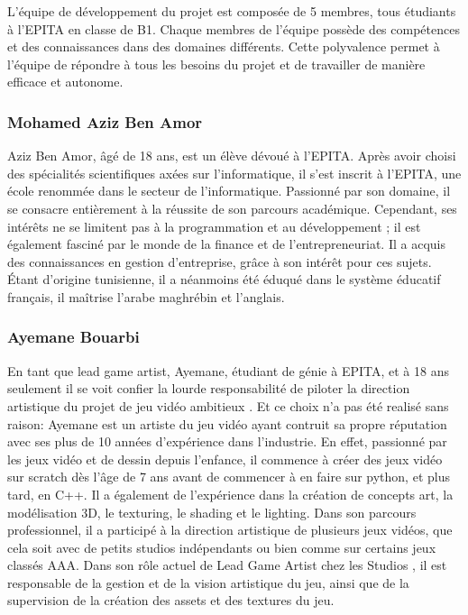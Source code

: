 

L'équipe de développement du projet est composée de 5 membres, tous étudiants à l'EPITA en classe de B1.
Chaque membres de l'équipe possède des compétences et des connaissances dans des domaines différents.
Cette polyvalence permet à l'équipe de répondre à tous les besoins du projet et de travailler de manière efficace et autonome.


\subsubsection*{Mohamed Aziz Ben Amor}

Aziz Ben Amor, âgé de 18 ans, est un élève dévoué à l'EPITA. 
Après avoir choisi des spécialités scientifiques axées sur l'informatique, il s'est inscrit à l'EPITA, une école renommée dans le secteur de l'informatique. 
Passionné par son domaine, il se consacre entièrement à la réussite de son parcours académique.
Cependant, ses intérêts ne se limitent pas à la programmation et au développement ; il est également fasciné par le monde de la finance et de l'entrepreneuriat. 
Il a acquis des connaissances en gestion d'entreprise, grâce à son intérêt pour ces sujets. 
Étant d'origine tunisienne, il a néanmoins été éduqué dans le système éducatif français, il maîtrise l'arabe maghrébin et l'anglais. 



\subsubsection*{Ayemane Bouarbi}

En tant que lead game artist, Ayemane, étudiant de génie à EPITA, et à 18 ans seulement il se voit confier la lourde responsabilité de piloter la direction artistique du projet de jeu vidéo ambitieux \textit{\gameName}. 
Et ce choix n’a pas été realisé sans raison: Ayemane est un artiste du jeu vidéo ayant contruit sa propre réputation avec ses plus de 10 années d'expérience dans l’industrie. 
En effet, passionné par les jeux vidéo et de dessin depuis l’enfance, il commence à créer des jeux vidéo sur scratch dès l'âge de 7 ans avant de commencer à en faire sur python, et plus tard, en C++. 
Il a également de l’expérience dans la création de concepts art, la modélisation 3D, le texturing, le shading et le lighting.
Dans son parcours professionnel, il a participé à la direction artistique de plusieurs jeux vidéos, que cela soit avec de petits studios indépendants ou bien comme sur certains jeux classés AAA.
Dans son rôle actuel de Lead Game Artist chez les Studios \textit{\companyName}, il est responsable de la gestion et de la vision artistique du jeu, ainsi que de la  supervision de la création des assets et des textures du jeu.


